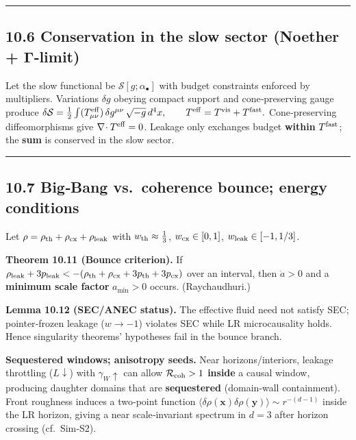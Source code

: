 \documentclass[
]{article}
\numberwithin{equation}{section}
\begin{document}
\begin{center}\rule{0.5\linewidth}{0.5pt}\end{center}

\hypertarget{conservation-in-the-slow-sector-noether-ux3b3limit}{%
\subsection{10.6 Conservation in the slow sector (Noether +
Γ‑limit)}\label{conservation-in-the-slow-sector-noether-ux3b3limit}}

Let the slow functional be \(\mathcal S[g;\alpha_\bullet]\) with budget
constraints enforced by multipliers. Variations \(\delta g\) obeying
compact support and cone‑preserving gauge produce
\(\delta\mathcal S=\tfrac12\int (T^{\rm eff}_{\mu\nu})\,\delta g^{\mu\nu}\,\sqrt{-g}\,d^4x,\qquad T^{\rm eff}=T^{\rm vis}+T^{\rm fast}.\)
Cone‑preserving diffeomorphisms give \(\nabla\!\cdot T^{\rm eff}=0\).
Leakage only exchanges budget \textbf{within} \(T^{\rm fast}\); the
\textbf{sum} is conserved in the slow sector.

\begin{center}\rule{0.5\linewidth}{0.5pt}\end{center}

\hypertarget{bigbang-vs.-coherence-bounce-energy-conditions}{%
\subsection{10.7 Big‑Bang vs.~coherence bounce; energy
conditions}\label{bigbang-vs.-coherence-bounce-energy-conditions}}

Let \(\rho=\rho_{\rm th}+\rho_{\rm cx}+\rho_{\rm leak}\) with
\(w_{\rm th}\approx\tfrac13\), \(w_{\rm cx}\in[0,1]\),
\(w_{\rm leak}\in[-1,1/3]\).

\textbf{Theorem 10.11 (Bounce criterion).} If
\(\rho_{\rm leak}+3p_{\rm leak}<-(\rho_{\rm th}+\rho_{\rm cx}+3p_{\rm th}+3p_{\rm cx})\)
over an interval, then \(\ddot a>0\) and a \textbf{minimum scale factor}
\(a_{\min}>0\) occurs. (Raychaudhuri.)

\textbf{Lemma 10.12 (SEC/ANEC status).} The effective fluid need not
satisfy SEC; pointer‑frozen leakage (\(w\to-1\)) violates SEC while LR
microcausality holds. Hence singularity theorems' hypotheses fail in the
bounce branch.

\textbf{Sequestered windows; anisotropy seeds.} Near horizons/interiors,
leakage throttling (\(L\downarrow\)) with \(\gamma_W\uparrow\) can allow
\(\mathcal R_{\rm coh}>1\) \textbf{inside} a causal window, producing
daughter domains that are \textbf{sequestered} (domain‑wall
containment). Front roughness induces a two‑point function
\(\langle\delta\rho(\mathbf x)\delta\rho(\mathbf y)\rangle\sim r^{-(d-1)}\)
inside the LR horizon, giving a near scale‑invariant spectrum in \(d=3\)
after horizon crossing (cf.~Sim‑S2).
\end{document}
